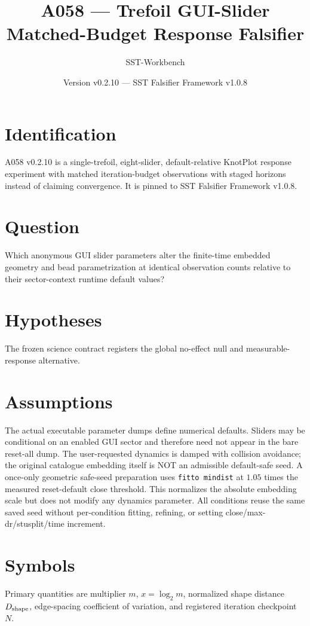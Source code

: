 \documentclass[11pt,a4paper]{article}
\begin{document}
\title{A058 --- Trefoil GUI-Slider Matched-Budget Response Falsifier}
\author{SST-Workbench}\date{Version v0.2.10 --- SST Falsifier Framework v1.0.8}\maketitle
{}
\section{Identification}
A058 v0.2.10 is a single-trefoil, eight-slider, default-relative KnotPlot response experiment with matched iteration-budget observations with staged horizons instead of claiming convergence. It is pinned to SST Falsifier Framework v1.0.8.
\section{Question}
Which anonymous GUI slider parameters alter the finite-time embedded geometry and bead parametrization at identical observation counts relative to their sector-context runtime default values?
\section{Hypotheses}
The frozen science contract registers the global no-effect null and measurable-response alternative.
\section{Assumptions}
The actual executable parameter dumps define numerical defaults. Sliders may be conditional on an enabled GUI sector and therefore need not appear in the bare reset-all dump. The user-requested dynamics is damped with collision avoidance; the original catalogue embedding itself is NOT an admissible default-safe seed. A once-only geometric safe-seed preparation uses \texttt{fitto mindist} at $1.05$ times the measured reset-default close threshold. This normalizes the absolute embedding scale but does not modify any dynamics parameter. All conditions reuse the same saved seed without per-condition fitting, refining, or setting close/max-dr/stusplit/time increment.
\section{Symbols}
Primary quantities are multiplier $m$, $x=\log_2m$, normalized shape distance $D_{\rm shape}$, edge-spacing coefficient of variation, and registered iteration checkpoint $N$.
\end{document}

